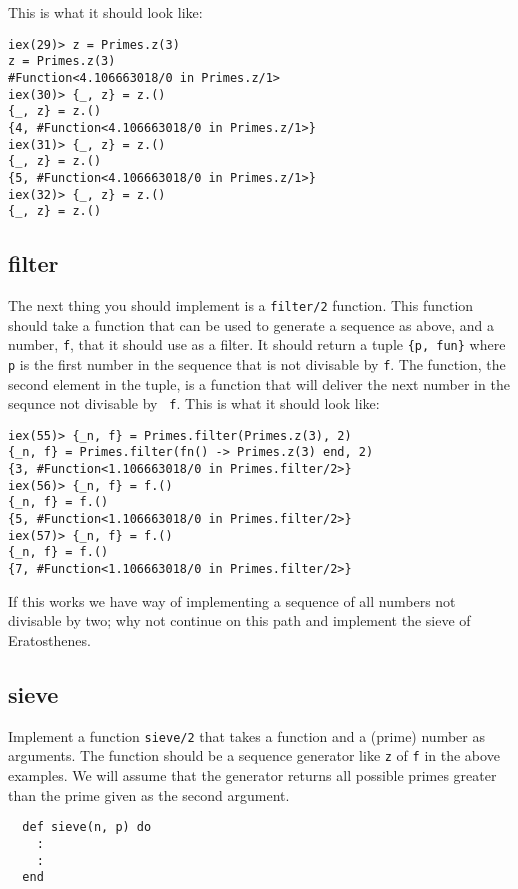 \documentclass[a4paper,11pt]{article}
\begin{document}
This is what it should look like:

\begin{verbatim}
iex(29)> z = Primes.z(3)
z = Primes.z(3)
#Function<4.106663018/0 in Primes.z/1>
iex(30)> {_, z} = z.()
{_, z} = z.()
{4, #Function<4.106663018/0 in Primes.z/1>}
iex(31)> {_, z} = z.()
{_, z} = z.()
{5, #Function<4.106663018/0 in Primes.z/1>}
iex(32)> {_, z} = z.()
{_, z} = z.()
\end{verbatim}

\subsection*{filter}

The next thing you should implement is a {\tt filter/2} function. This
function should take a function that can be used to generate a
sequence as above, and a number, {\tt f}, that it should use as a
filter. It should return a tuple {\tt \{p, fun\}} where {\tt p} is
the first number in the sequence that is not divisable by {\tt f}. The
function, the second element in the tuple, is a function that
will deliver the next number in the sequnce not divisable by {\tt
  f}. This is what it should look like:

\begin{verbatim}
iex(55)> {_n, f} = Primes.filter(Primes.z(3), 2)
{_n, f} = Primes.filter(fn() -> Primes.z(3) end, 2)
{3, #Function<1.106663018/0 in Primes.filter/2>}
iex(56)> {_n, f} = f.()
{_n, f} = f.()
{5, #Function<1.106663018/0 in Primes.filter/2>}
iex(57)> {_n, f} = f.()
{_n, f} = f.()
{7, #Function<1.106663018/0 in Primes.filter/2>}
\end{verbatim}

If this works we have way of implementing a sequence of all numbers
not divisable by two; why not continue on this path and implement
the sieve of Eratosthenes.

\subsection*{sieve}

Implement a function {\tt sieve/2} that takes a function and a (prime)
number as arguments. The function should be a sequence generator like
{\tt z} of {\tt f} in the above examples. We will assume that the
generator returns all possible primes greater than the prime given as
the second argument.

\begin{verbatim}
  def sieve(n, p) do
    :
    :
  end
\end{verbatim}
\end{document}
